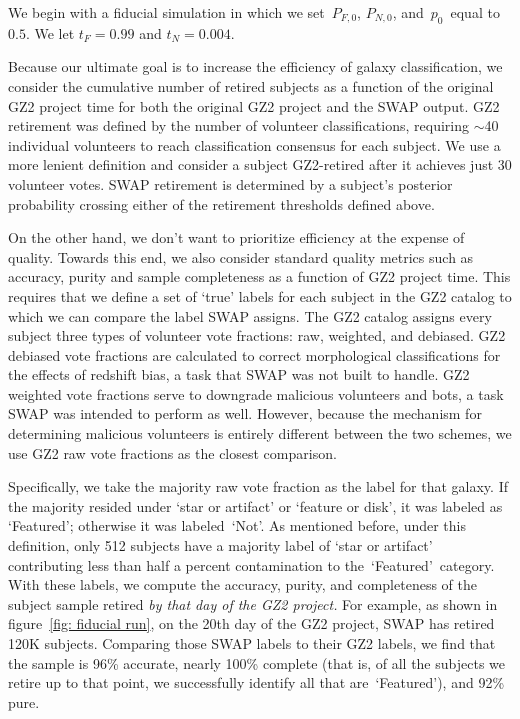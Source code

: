 \documentclass[twocolumn]{aastex6}
\newcommand{\Pf}{$P_{F,0}$}
\newcommand{\Pn}{$P_{N,0}$}
\newcommand{\p}{$p_0$}
\newcommand{\feat}{`Featured'}
\newcommand{\notfeat}{`Not'}
\begin{document}
We begin with a fiducial simulation in which we set~\Pf, \Pn, and~\p~equal to $0.5$.
We let $t_F = 0.99$ and $t_N = 0.004$. 

Because our ultimate goal is to increase the efficiency of galaxy classification,
we consider the cumulative number of retired subjects
as a function of the original GZ2 project time for both the original GZ2 project
and the SWAP output. 
GZ2 retirement was defined by the number of volunteer classifications, requiring
$\sim$40 individual volunteers to reach classification consensus for each subject. 
We use a more lenient definition and consider a subject GZ2-retired after it achieves 
just 30 volunteer votes. SWAP retirement is determined by a subject's posterior 
probability crossing either of the retirement thresholds defined above. 

On the other hand, we don't want to prioritize efficiency at the expense of quality. 
Towards this end, we also consider standard quality metrics such as accuracy, 
purity and sample completeness as a function of GZ2 project time. This requires 
that we define a set of `true' labels for each subject in the GZ2 catalog to which
we can compare the label SWAP assigns.  The GZ2 catalog assigns every subject
three types of volunteer vote fractions: raw, weighted, and debiased. 
GZ2 debiased vote fractions are calculated to correct morphological classifications for the
 effects of redshift bias, a task that SWAP was not built to handle. 
GZ2 weighted vote fractions serve to downgrade malicious volunteers and bots, a task
SWAP was intended to perform as well.  However, because the mechanism for
determining malicious volunteers is entirely different between the two schemes, we 
use GZ2 raw vote fractions as the closest comparison. 

Specifically, we take the majority raw vote fraction as the label for that galaxy. If the 
majority resided under `star or artifact' or `feature or disk', it was labeled as \feat; 
otherwise it was labeled~\notfeat. As mentioned before, under this definition, 
only 512 subjects have a majority label of `star or artifact' contributing less than 
half a percent contamination to the~\feat~category. With these labels, we compute
the accuracy, purity, and completeness of the subject sample retired 
\textit{by that day of the GZ2 project.} For example, as shown in figure~\ref{fig: fiducial run}, 
on the 20th day of the GZ2 project, 
SWAP has retired 120K subjects. Comparing those SWAP labels to their GZ2 labels, 
we find that the sample is 96\% accurate, nearly 100\% complete (that is, of all
the subjects we retire up to that point, we successfully identify all that are~\feat),
and 92\% pure. 
\end{document}
